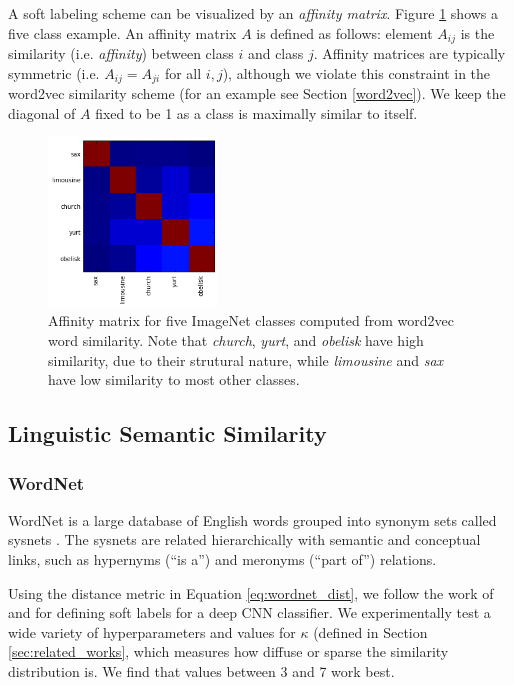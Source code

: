 A soft labeling scheme can be visualized by an \emph{affinity matrix}. Figure
\ref{fig:aff-5_1} shows a five class example. An affinity matrix $A$ is defined
as follows: element $A_{ij}$ is the similarity (i.e. \emph{affinity}) between
class $i$ and class $j$. Affinity matrices are typically symmetric (i.e. $A_{ij}
= A_{ji}$ for all $i, j$), although we violate this constraint in the word2vec
similarity scheme (for an example see Section \ref{word2vec}). We keep the
diagonal of $A$ fixed to be 1 as a class is maximally similar to itself.

\begin{figure}[!tb]
  \centering
  \includegraphics[width=0.4\textwidth]{figs/aff-5_1.png}
  \caption{
      Affinity matrix for five ImageNet classes computed from word2vec word
      similarity. Note that \emph{church}, \emph{yurt}, and
      \emph{obelisk} have high similarity, due to their strutural nature, while
      \emph{limousine} and \emph{sax} have low similarity to most other classes.
  }
  \label{fig:aff-5_1}
\end{figure}

\subsection{Linguistic Semantic Similarity}


\subsubsection{WordNet}

WordNet is a large database of English words grouped into synonym sets called
sysnets \cite{miller1995wordnet}.
The sysnets are related hierarchically with semantic and conceptual links, such
as hypernyms (``is a'') and meronyms (``part of'') relations.

Using the distance metric in Equation \ref{eq:wordnet_dist}, we follow the work
of \cite{fergus2010semantic} and \cite{zhao2011large} for defining soft labels
for a deep CNN classifier. We experimentally test a wide variety of
hyperparameters and values for $\kappa$ (defined in Section
\ref{sec:related_works}, which measures how diffuse or sparse the similarity
distribution is. We find that values between 3 and 7 work best.

